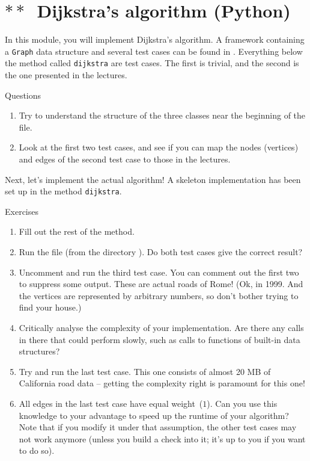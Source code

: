 \section{$\ast\ast$~Dijkstra's algorithm (Python)}

In this module, you will implement Dijkstra's algorithm. A framework containing a \texttt{Graph} data structure and several test cases can be found in . Everything below the method called \texttt{dijkstra} are test cases. The first is trivial, and the second is the one presented in the lectures.
%
\begin{mybox}{Questions}
    \begin{enumerate}
        \item Try to understand the structure of the three classes near the beginning of the file.
        \item Look at the first two test cases, and see if you can map the nodes (vertices) and edges of the second test case to those in the lectures.
    \end{enumerate}
\end{mybox}

Next, let's implement the actual algorithm! A skeleton implementation has been set up in the method \texttt{dijkstra}.
%
\begin{mybox}{Exercises}
    \begin{enumerate}
        \item Fill out the rest of the method.
        \item Run the file (from the directory ). Do both test cases give the correct result?
        \item Uncomment and run the third test case. You can comment out the first two to suppress some output. These are actual roads of Rome! (Ok, in 1999. And the vertices are represented by arbitrary numbers, so don't bother trying to find your house.)
        \item Critically analyse the complexity of your implementation. Are there any calls in there that could perform slowly, such as calls to functions of built-in data structures?
        \item Try and run the last test case. This one consists of almost 20 MB of California road data -- getting the complexity right is paramount for this one!
        \item All edges in the last test case have equal weight~($1$). Can you use this knowledge to your advantage to speed up the runtime of your algorithm? Note that if you modify it under that assumption, the other test cases may not work anymore (unless you build a check into it; it's up to you if you want to do so).
    \end{enumerate}
\end{mybox}

